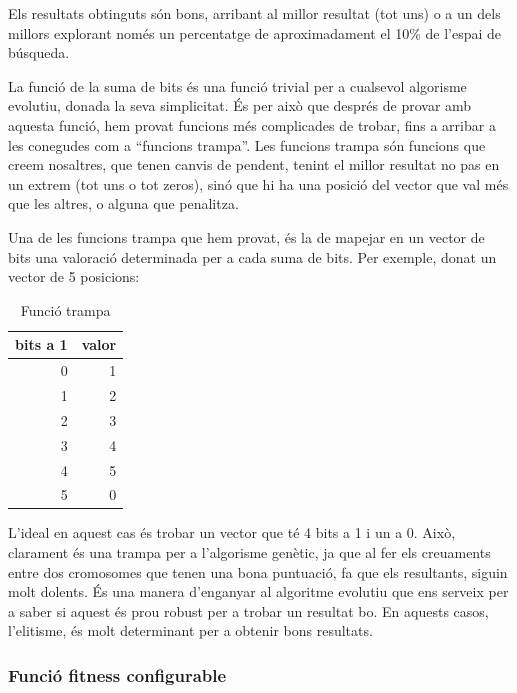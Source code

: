 \documentclass[titlepage,a4paper,12pt]{book}
\begin{document}
Els resultats obtinguts són bons, arribant al millor resultat (tot uns) o a un
dels millors explorant només un percentatge de aproximadament el  10\% de
l'espai de búsqueda.

La funció de la suma de bits és una funció trivial per a cualsevol algorisme
evolutiu, donada la seva simplicitat.  És per això que després de provar amb
aquesta funció, hem provat funcions més complicades de trobar, fins a arribar a
les conegudes com a ``funcions trampa''.  Les funcions trampa són funcions que
creem nosaltres, que tenen canvis de pendent, tenint el millor resultat no pas
en un extrem (tot uns o tot zeros), sinó que hi ha una posició del vector que
val més que les altres, o alguna que penalitza.

Una de les funcions trampa que hem provat, és la de mapejar en un vector de bits
una valoració determinada per a cada suma de bits.  Per exemple, donat un vector
de 5 posicions:


\begin{table}
\centering
\caption{Funció trampa}
\begin{tabular}{|r|r|}
\hline
\multicolumn{1}{|c|}{\textbf{bits a 1 }} & \multicolumn{1}{c|}{\textbf{ valor}} \\
\hline
\hline
0 & 1 \\
1 & 2 \\
2 & 3 \\
3 & 4 \\
4 & 5 \\
5 & 0 \\
\hline
\end{tabular}
\end{table}


L'ideal en aquest cas és trobar un vector que té 4 bits a 1 i un a 0.  Això,
clarament és una trampa per a l'algorisme genètic, ja que al fer els creuaments
entre dos cromosomes que tenen una bona puntuació, fa que els resultants, siguin
molt dolents. És una manera d'enganyar al algoritme evolutiu que ens serveix per
a saber si aquest és prou robust per a trobar un resultat bo.  En aquests casos,
l'elitisme, és molt determinant per a obtenir bons resultats.

\subsubsection{Funció fitness configurable} %
\label{ssub:Funcio fitness configurable}
\end{document}
